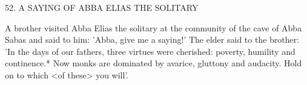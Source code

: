 52. A SAYING OF ABBA ELIAS THE SOLITARY

A brother visited Abba Elias the solitary at the community of the
cave of Abba Sabas and said to him: 'Abba, give me a saying!' The
elder said to the brother: 'In the days of our fathers, three virtues
were cherished: poverty, humility and continence.* Now monks are
dominated by avarice, gluttony and audacity. Hold on to which <of
these> you will'.

